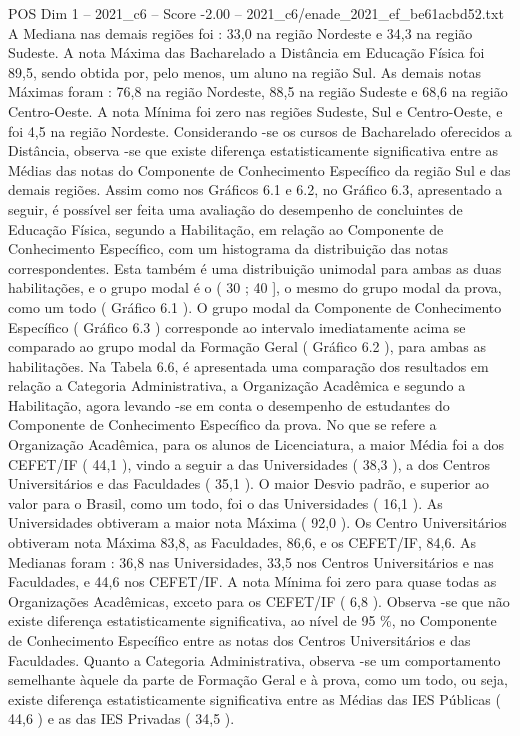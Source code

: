 \begin{textsample}{POS Dim 1 – 2021\_c6 – Score -2.00 – 2021\_c6/enade\_2021\_ef\_be61acbd52.txt}
A Mediana nas demais regiões foi : 33,0 na região Nordeste e 34,3 na região Sudeste.
A nota Máxima das Bacharelado a Distância em Educação Física foi 89,5, sendo obtida por, pelo menos, um aluno na região Sul.
As demais notas Máximas foram : 76,8 na região Nordeste, 88,5 na região Sudeste e 68,6 na região Centro-Oeste.
A nota Mínima foi zero nas regiões Sudeste, Sul e Centro-Oeste, e foi 4,5 na região Nordeste.
Considerando -se os cursos de Bacharelado oferecidos a Distância, observa -se que existe diferença estatisticamente significativa entre as Médias das notas do Componente de Conhecimento Específico da região Sul e das demais regiões.
Assim como nos Gráficos 6.1 e 6.2, no Gráfico 6.3, apresentado a seguir, é possível ser feita uma avaliação do desempenho de concluintes de Educação Física, segundo a Habilitação, em relação ao Componente de Conhecimento Específico, com um histograma da distribuição das notas correspondentes.
Esta também é uma distribuição unimodal para ambas as duas habilitações, e o grupo modal é o ( 30 ; 40 ], o mesmo do grupo modal da prova, como um todo ( Gráfico 6.1 ).
O grupo modal da Componente de Conhecimento Específico ( Gráfico 6.3 ) corresponde ao intervalo imediatamente acima se comparado ao grupo modal da Formação Geral ( Gráfico 6.2 ), para ambas as habilitações.
Na Tabela 6.6, é apresentada uma comparação dos resultados em relação a Categoria Administrativa, a Organização Acadêmica e segundo a Habilitação, agora levando -se em conta o desempenho de estudantes do Componente de Conhecimento Específico da prova.
No que se refere a Organização Acadêmica, para os alunos de Licenciatura, a maior Média foi a dos CEFET/IF ( 44,1 ), vindo a seguir a das Universidades ( 38,3 ), a dos Centros Universitários e das Faculdades ( 35,1 ).
O maior Desvio padrão, e superior ao valor para o Brasil, como um todo, foi o das Universidades ( 16,1 ).
As Universidades obtiveram a maior nota Máxima ( 92,0 ).
Os Centro Universitários obtiveram nota Máxima 83,8, as Faculdades, 86,6, e os CEFET/IF, 84,6.
As Medianas foram : 36,8 nas Universidades, 33,5 nos Centros Universitários e nas Faculdades, e 44,6 nos CEFET/IF.
A nota Mínima foi zero para quase todas as Organizações Acadêmicas, exceto para os CEFET/IF ( 6,8 ).
Observa -se que não existe diferença estatisticamente significativa, ao nível de 95 \%, no Componente de Conhecimento Específico entre as notas dos Centros Universitários e das Faculdades.
Quanto a Categoria Administrativa, observa -se um comportamento semelhante àquele da parte de Formação Geral e à prova, como um todo, ou seja, existe diferença estatisticamente significativa entre as Médias das IES Públicas ( 44,6 ) e as das IES Privadas ( 34,5 ).

\end{textsample}
